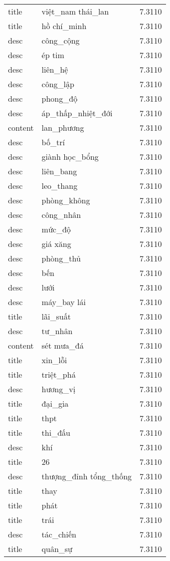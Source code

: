 \documentclass{article}
\begin{document}
\begin{tabular}{lll}
title & việt\_nam thái\_lan & 7.3110\\
title & hồ chí\_minh & 7.3110\\
desc & công\_cộng & 7.3110\\
desc & ép tim & 7.3110\\
desc & liên\_hệ & 7.3110\\
desc & công\_lập & 7.3110\\
desc & phong\_độ & 7.3110\\
desc & áp\_thấp\_nhiệt\_đới & 7.3110\\
content & lan\_phương & 7.3110\\
desc & bố\_trí & 7.3110\\
desc & giành học\_bổng & 7.3110\\
desc & liên\_bang & 7.3110\\
desc & leo\_thang & 7.3110\\
desc & phòng\_không & 7.3110\\
desc & công\_nhân & 7.3110\\
desc & mức\_độ & 7.3110\\
desc & giá xăng & 7.3110\\
desc & phòng\_thủ & 7.3110\\
desc & bến & 7.3110\\
desc & lưới & 7.3110\\
desc & máy\_bay lái & 7.3110\\
title & lãi\_suất & 7.3110\\
desc & tư\_nhân & 7.3110\\
content & sét mưa\_đá & 7.3110\\
title & xin\_lỗi & 7.3110\\
title & triệt\_phá & 7.3110\\
desc & hương\_vị & 7.3110\\
title & đại\_gia & 7.3110\\
title & thpt & 7.3110\\
title & thi\_đấu & 7.3110\\
desc & khí & 7.3110\\
title & 26 & 7.3110\\
desc & thượng\_đỉnh tổng\_thống & 7.3110\\
title & thay & 7.3110\\
title & phát & 7.3110\\
title & trái & 7.3110\\
desc & tác\_chiến & 7.3110\\
title & quân\_sự & 7.3110\\

\end{tabular}
\end{document}
